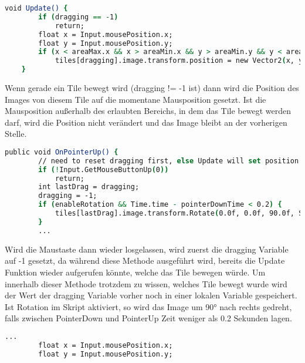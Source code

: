 {\begin{lstlisting}[language=csh, caption={Update Methode des SnapDragControllers}]
void Update() {
        if (dragging == -1)
            return;
        float x = Input.mousePosition.x;
        float y = Input.mousePosition.y;
        if (x < areaMax.x && x > areaMin.x && y > areaMin.y && y < areaMax.y)
            tiles[dragging].image.transform.position = new Vector2(x, y);
    }
\end{lstlisting}
Wenn gerade ein Tile bewegt wird (dragging != -1 ist) dann wird die Position des Images von diesem Tile auf die momentane Mausposition gesetzt. Ist die Mausposition außerhalb des erlaubten Bereichs, in dem das Tile bewegt werden darf, wird die Position nicht verändert und das Image bleibt an der vorherigen Stelle.\\

\begin{lstlisting}[language=csh, caption={Ausschnitt der OnPointerUp Methode des SnapDragControllers}]
public void OnPointerUp() {
        // need to reset dragging first, else Update will set position while this function is executed
        if (!Input.GetMouseButtonUp(0))
            return;
        int lastDrag = dragging;
        dragging = -1;
        if (enableRotation && Time.time - pointerDownTime < 0.2) {
            tiles[lastDrag].image.transform.Rotate(0.0f, 0.0f, 90.0f, Space.Self);
        }
        ...
\end{lstlisting}
Wird die Maustaste dann wieder losgelassen, wird zuerst die dragging Variable auf -1 gesetzt, da während diese Methode ausgeführt wird, bereits die Update Funktion wieder aufgerufen könnte, welche das Tile bewegen würde. Um innerhalb dieser Methode trotzdem zu wissen, welches Tile bewegt wurde wird der Wert der dragging Variable vorher noch in einer lokalen Variable gespeichert.\\
Ist Rotation im Skript aktiviert, so wird das Image um 90° nach rechts gedreht, falls zwischen PointerDown und PointerUp Zeit weniger als 0.2 Sekunden lagen.\\
\begin{lstlisting}[language=csh, caption={Setzen der Position in der OnPointerUp Methode}]
		...
 		float x = Input.mousePosition.x;
        float y = Input.mousePosition.y;


\end{lstlisting}}
